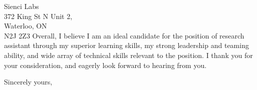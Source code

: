 \documentclass[11pt]{letter} %
\begin{document}
\begin{letter}{Sienci Labs \\
 372 King St N Unit 2,\\
 Waterloo, ON \\
 N2J 2Z3}
Overall, I believe I am an ideal candidate for the position of research assistant through my superior learning skills, my strong leadership and teaming ability, and wide array of technical skills relevant to the position. I thank you for your consideration, and eagerly look forward to hearing from you.

\closing{Sincerely yours,}


\end{letter}
\end{document}

